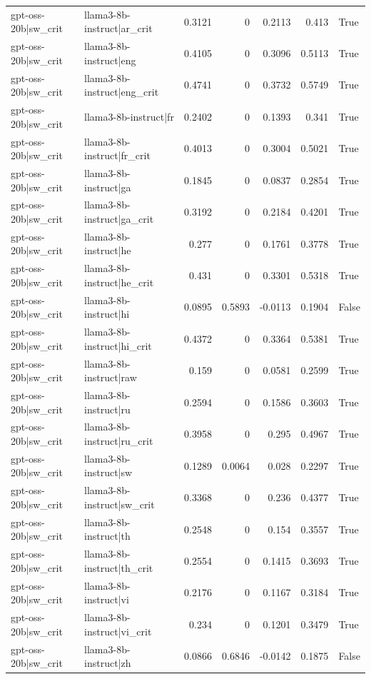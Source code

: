 \begin{table}
\begin{tabular}{l l r r r r l}
gpt-oss-20b|sw_crit & llama3-8b-instruct|ar_crit & 0.3121 & 0 & 0.2113 & 0.413 & True \\
gpt-oss-20b|sw_crit & llama3-8b-instruct|eng & 0.4105 & 0 & 0.3096 & 0.5113 & True \\
gpt-oss-20b|sw_crit & llama3-8b-instruct|eng_crit & 0.4741 & 0 & 0.3732 & 0.5749 & True \\
gpt-oss-20b|sw_crit & llama3-8b-instruct|fr & 0.2402 & 0 & 0.1393 & 0.341 & True \\
gpt-oss-20b|sw_crit & llama3-8b-instruct|fr_crit & 0.4013 & 0 & 0.3004 & 0.5021 & True \\
gpt-oss-20b|sw_crit & llama3-8b-instruct|ga & 0.1845 & 0 & 0.0837 & 0.2854 & True \\
gpt-oss-20b|sw_crit & llama3-8b-instruct|ga_crit & 0.3192 & 0 & 0.2184 & 0.4201 & True \\
gpt-oss-20b|sw_crit & llama3-8b-instruct|he & 0.277 & 0 & 0.1761 & 0.3778 & True \\
gpt-oss-20b|sw_crit & llama3-8b-instruct|he_crit & 0.431 & 0 & 0.3301 & 0.5318 & True \\
gpt-oss-20b|sw_crit & llama3-8b-instruct|hi & 0.0895 & 0.5893 & -0.0113 & 0.1904 & False \\
gpt-oss-20b|sw_crit & llama3-8b-instruct|hi_crit & 0.4372 & 0 & 0.3364 & 0.5381 & True \\
gpt-oss-20b|sw_crit & llama3-8b-instruct|raw & 0.159 & 0 & 0.0581 & 0.2599 & True \\
gpt-oss-20b|sw_crit & llama3-8b-instruct|ru & 0.2594 & 0 & 0.1586 & 0.3603 & True \\
gpt-oss-20b|sw_crit & llama3-8b-instruct|ru_crit & 0.3958 & 0 & 0.295 & 0.4967 & True \\
gpt-oss-20b|sw_crit & llama3-8b-instruct|sw & 0.1289 & 0.0064 & 0.028 & 0.2297 & True \\
gpt-oss-20b|sw_crit & llama3-8b-instruct|sw_crit & 0.3368 & 0 & 0.236 & 0.4377 & True \\
gpt-oss-20b|sw_crit & llama3-8b-instruct|th & 0.2548 & 0 & 0.154 & 0.3557 & True \\
gpt-oss-20b|sw_crit & llama3-8b-instruct|th_crit & 0.2554 & 0 & 0.1415 & 0.3693 & True \\
gpt-oss-20b|sw_crit & llama3-8b-instruct|vi & 0.2176 & 0 & 0.1167 & 0.3184 & True \\
gpt-oss-20b|sw_crit & llama3-8b-instruct|vi_crit & 0.234 & 0 & 0.1201 & 0.3479 & True \\
gpt-oss-20b|sw_crit & llama3-8b-instruct|zh & 0.0866 & 0.6846 & -0.0142 & 0.1875 & False \\

\end{tabular}
\end{table}
